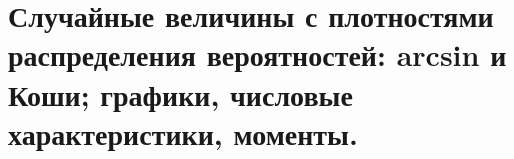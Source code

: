\documentclass[polytech/stats/exam-2023/stats-exam-2023.tex]{subfiles}
\begin{document}
\section{Случайные величины с плотностями распределения вероятностей: arcsin и Коши; графики, числовые характеристики, моменты.}
\end{document}
